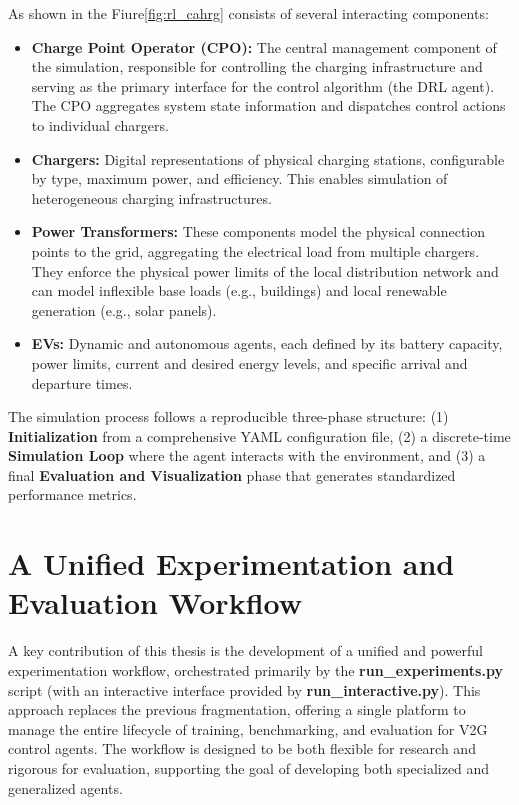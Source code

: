 As shown in the Fiure\ref{fig:rl_cahrg} consists of several interacting components:
\begin{itemize}
    \item \textbf{Charge Point Operator (CPO):} The central management component of the simulation, responsible for controlling the charging infrastructure and serving as the primary interface for the control algorithm (the DRL agent). The CPO aggregates system state information and dispatches control actions to individual chargers.
    \item \textbf{Chargers:} Digital representations of physical charging stations, configurable by type, maximum power, and efficiency. This enables simulation of heterogeneous charging infrastructures.
    \item \textbf{Power Transformers:} These components model the physical connection points to the grid, aggregating the electrical load from multiple chargers. They enforce the physical power limits of the local distribution network and can model inflexible base loads (e.g., buildings) and local renewable generation (e.g., solar panels).
    \item \textbf{EVs:} Dynamic and autonomous agents, each defined by its battery capacity, power limits, current and desired energy levels, and specific arrival and departure times.
\end{itemize}

The simulation process follows a reproducible three-phase structure: (1) \textbf{Initialization} from a comprehensive YAML configuration file, (2) a discrete-time \textbf{Simulation Loop} where the agent interacts with the environment, and (3) a final \textbf{Evaluation and Visualization} phase that generates standardized performance metrics.



\section{A Unified Experimentation and Evaluation Workflow}

A key contribution of this thesis is the development of a unified and powerful experimentation workflow, orchestrated primarily by the \textbf{run\_experiments.py} script (with an interactive interface provided by \textbf{run\_interactive.py}). This approach replaces the previous fragmentation, offering a single platform to manage the entire lifecycle of training, benchmarking, and evaluation for V2G control agents. The workflow is designed to be both flexible for research and rigorous for evaluation, supporting the goal of developing both specialized and generalized agents.

